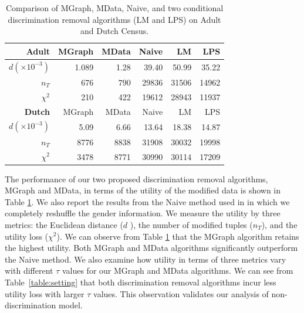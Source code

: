 \documentclass[twoside,leqno,twocolumn]{article}
\begin{document}
\begin{table}[htbp]
\small
	\centering
	\caption{Comparison of MGraph, MData, Naive, and two conditional discrimination removal algorithms (LM and LPS) on Adult and Dutch Census.} %
	\label{table:comparison}
	\begin{tabular}{|r|r|r||r|r|r|}
		\hline
		{\bf Adult} &    MGraph &  MData &   Naive &    LM &     LPS \\ \hline
		  $d(\times 10^{-3})$ & 	1.089&	1.28& 39.40& 50.99  & 35.22  \\ \hline	
		      $n_T$ &       676 &    790 &   29836 & 31506  &   14962 \\ \hline
		   $\chi^2$ &       210 &    422 & 19612 & 28943 & 11937  \\ \hline
		{\bf Dutch} &    MGraph &  MData &   Naive &    LM &     LPS \\ \hline
		  $d(\times 10^{-3})$ &  	5.09&	6.66& 13.64& 18.38 & 14.87 \\ \hline		
		      $n_T$ &      8776 &   8838 &  31908 &  30032  &   19998 \\ \hline
		   $\chi^2$ &      3478 &   8771 &  30990 &  30114  &  17209 \\ \hline
	\end{tabular}
\end{table}

The performance of our two proposed discrimination removal algorithms, MGraph and MData, in terms of the utility of the modified data is shown in Table \ref{table:comparison}.  We also report the results from the Naive method used in \cite{feldman2015certifying} in which we completely reshuffle the gender information. We measure the utility by three metrics: the Euclidean distance ($d$ ), the number of modified tuples ($n_T$), and the utility loss ($\chi^2$). We can observe from Table \ref{table:comparison} that the MGraph algorithm retains the highest utility. Both MGraph and MData algorithms significantly outperform the Naive method. We also examine how utility in terms of three metrics vary with different $\tau$ values for our MGraph and MData algorithms. 
We can see from Table~\ref{table:setting} that both discrimination removal algorithms incur less utility loss with larger $\tau$ values. This observation validates our analysis of non-discrimination model.
\end{document}
